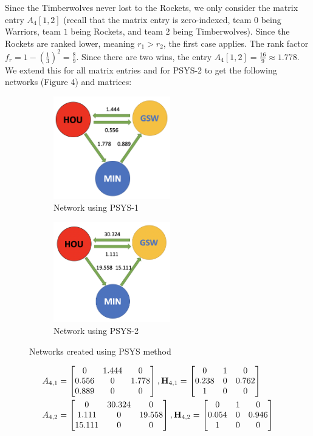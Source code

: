 \documentclass[12pt]{article}%
\begin{document}
  \null\quad\quad Since the Timberwolves never lost to the Rockets, we only consider the matrix entry $A_4[1,2]$ (recall that the matrix entry is zero-indexed, team $0$ being Warriors, team $1$ being Rockets, and team $2$ being Timberwolves). Since the Rockets are ranked lower, meaning $r_1>r_2$, the first case applies. The rank factor $f_r=1-(\frac{1}{3})^2=\frac{8}{9}$. Since there are two wins, the entry $A_4[1,2]=\frac{16}{9}\approx 1.778$. We extend this for all matrix entries and for PSYS-2 to get the following networks (Figure 4) and matrices:
  \begin{figure}[H]
  \centering
\begin{subfigure}{.5\textwidth}
  \centering
  \includegraphics[width=2in]{./images/PSYS-1.png}
  \caption{Network using PSYS-1}
  \label{fig:sub1}
\end{subfigure}%
\begin{subfigure}{.5\textwidth}
  \centering
  \includegraphics[width=2in]{./images/PSYS-2.png}
  \caption{Network using PSYS-2}
  \label{fig:sub2}
\end{subfigure}
\caption{Networks created using PSYS method}
\label{fig:test}
  \end{figure}
  \begin{align*}
&A_{4,1} =\begin{bmatrix}0 & 1.444 & 0\\0.556 & 0 & 1.778\\0.889 & 0 & 0\end{bmatrix}, \textbf H_{4,1}=\begin{bmatrix}0 & 1 & 0\\0.238 & 0 & 0.762\\1 & 0 & 0\end{bmatrix}\\
&A_{4,2} =\begin{bmatrix}0 & 30.324 & 0\\1.111 & 0 & 19.558\\15.111 & 0 & 0\end{bmatrix}, \textbf H_{4,2}=\begin{bmatrix}0 & 1 & 0\\0.054 & 0 & 0.946\\1 & 0 & 0\end{bmatrix}
\end{align*}
\end{document}

